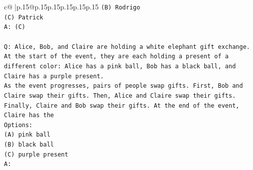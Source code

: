 \documentclass{article}
\begin{document}
{\begin{supertabular}{c@{$\;$}|p{.15\linewidth}@{}p{.15\linewidth}p{.15\linewidth}p{.15\linewidth}p{.15\linewidth}p{.15\linewidth}}
{{{\texttt{(B) Rodrigo} \\
\texttt{(C) Patrick} \\
\texttt{A: (C)} \\
\\ 
\texttt{Q: Alice, Bob, and Claire are holding a white elephant gift exchange. At the start of the event, they are each holding a present of a different color: Alice has a pink ball, Bob has a black ball, and Claire has a purple present.} \\
\texttt{As the event progresses, pairs of people swap gifts. First, Bob and Claire swap their gifts. Then, Alice and Claire swap their gifts. Finally, Claire and Bob swap their gifts. At the end of the event, Claire has the} \\
\texttt{Options:} \\
\texttt{(A) pink ball} \\
\texttt{(B) black ball} \\
\texttt{(C) purple present} \\
\texttt{A:} \\
            }
        }
    }
     \\ \\


\end{supertabular}}
\end{document}
